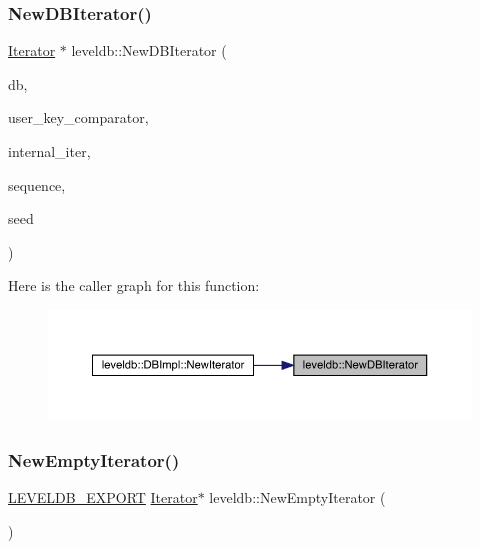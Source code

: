 \subsubsection{\texorpdfstring{NewDBIterator()}{NewDBIterator()}}
{\footnotesize\ttfamily \mbox{\hyperlink{classleveldb_1_1_iterator}{Iterator}} $\ast$ leveldb\+::\+New\+D\+B\+Iterator (\begin{DoxyParamCaption}\item[{\mbox{\hyperlink{classleveldb_1_1_d_b_impl}{D\+B\+Impl}} $\ast$}]{db,  }\item[{const \mbox{\hyperlink{structleveldb_1_1_comparator}{Comparator}} $\ast$}]{user\+\_\+key\+\_\+comparator,  }\item[{\mbox{\hyperlink{classleveldb_1_1_iterator}{Iterator}} $\ast$}]{internal\+\_\+iter,  }\item[{\mbox{\hyperlink{namespaceleveldb_a5481ededd221c36d652c371249f869fa}{Sequence\+Number}}}]{sequence,  }\item[{uint32\+\_\+t}]{seed }\end{DoxyParamCaption})}

Here is the caller graph for this function\+:
\nopagebreak
\begin{figure}[H]
\begin{center}
\leavevmode
\includegraphics[width=350pt]{namespaceleveldb_a0d4b256207f27afbf4ad03976fe0fae8_icgraph}
\end{center}
\end{figure}
\mbox{\label{namespaceleveldb_aa195cd33d90cdb6194264f0475af6c95}} 
\subsubsection{\texorpdfstring{NewEmptyIterator()}{NewEmptyIterator()}}
{\footnotesize\ttfamily \mbox{\hyperlink{export_8h_a658cd25b9dd114d894ae8ce9dddb7d3a}{L\+E\+V\+E\+L\+D\+B\+\_\+\+E\+X\+P\+O\+RT}} \mbox{\hyperlink{classleveldb_1_1_iterator}{Iterator}}$\ast$ leveldb\+::\+New\+Empty\+Iterator (\begin{DoxyParamCaption}{ }\end{DoxyParamCaption})}

